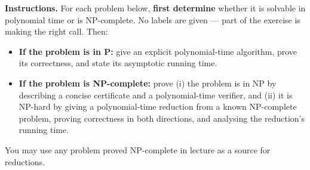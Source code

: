 \documentclass[9pt]{book}
\begin{document}
\pagestyle{headings}
\thispagestyle{plain}
\setcounter{chapter}{0}
\setcounter{page}{1}
\noindent
\begin{center}
\end{center}
\vspace*{4mm}

\textbf{Instructions.}
For each problem below, \textbf{first determine} whether it is solvable in polynomial time or is NP-complete.
No labels are given --- part of the exercise is making the right call.
Then:
\begin{itemize}
  \item \textbf{If the problem is in P:} give an explicit polynomial-time algorithm, prove its correctness, and state its asymptotic running time.
  \item \textbf{If the problem is NP-complete:} prove (i) the problem is in NP by describing a concise certificate and a polynomial-time verifier, and (ii) it is NP-hard by giving a polynomial-time reduction from a known NP-complete problem, proving correctness in both directions, and analysing the reduction's running time.
\end{itemize}
You may use any problem proved NP-complete in lecture as a source for reductions.

\bigskip
\end{document}
